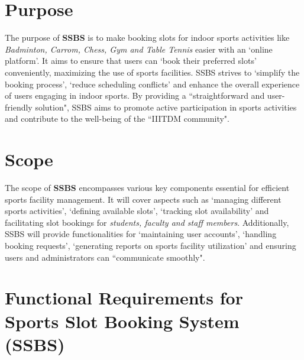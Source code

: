 \documentclass[12pt]{article}
\begin{document}
\vspace*{0.4cm}

\section*{Purpose}
\hspace{0.8cm} The purpose of \textbf{SSBS} is to make booking slots for indoor sports activities like \textit{Badminton, Carrom, Chess, Gym and Table Tennis} easier with an `online platform'. It aims to ensure that users can `book their preferred slots' conveniently, maximizing the use of sports facilities. SSBS strives to `simplify the booking process', `reduce scheduling conflicts' and enhance the overall experience of users engaging in indoor sports. By providing a ``straightforward and user-friendly solution", SSBS aims to promote active participation in sports activities and contribute to the well-being of the ``IIITDM community".

\vspace*{0.4cm}

\section*{Scope}
\hspace{0.8cm} The scope of \textbf{SSBS} encompasses various key components essential for efficient sports facility management. It will cover aspects such as `managing different sports activities', `defining available slots', `tracking slot availability' and facilitating slot bookings for \textit{students, faculty and staff members}. Additionally, SSBS will provide functionalities for `maintaining user accounts', `handling booking requests', `generating reports on sports facility utilization' and ensuring users and administrators can ``communicate smoothly".

\vspace*{0.4cm}

\section*{Functional Requirements for Sports Slot Booking System (SSBS)}
\end{document}
